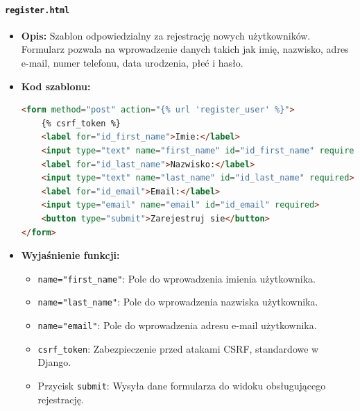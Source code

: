 \documentclass[12pt,a4paper,oneside]{article}
\theoremstyle{definition}
\numberwithin{equation}{section}
\begin{document}
\paragraph{\texttt{register.html}}
\begin{itemize}
    \item \textbf{Opis:} Szablon odpowiedzialny za rejestrację nowych użytkowników. Formularz pozwala na wprowadzenie danych takich jak imię, nazwisko, adres e-mail, numer telefonu, data urodzenia, płeć i hasło.
    \item \textbf{Kod szablonu:}
    \begin{lstlisting}[language=HTML, caption=Szablon \texttt{register.html}]
<form method="post" action="{% url 'register_user' %}">
    {% csrf_token %}
    <label for="id_first_name">Imie:</label>
    <input type="text" name="first_name" id="id_first_name" required>
    <label for="id_last_name">Nazwisko:</label>
    <input type="text" name="last_name" id="id_last_name" required>
    <label for="id_email">Email:</label>
    <input type="email" name="email" id="id_email" required>
    <button type="submit">Zarejestruj sie</button>
</form>
    \end{lstlisting}
    \item \textbf{Wyjaśnienie funkcji:}
    \begin{itemize}
        \item \texttt{name="first\_name"}: Pole do wprowadzenia imienia użytkownika.
        \item \texttt{name="last\_name"}: Pole do wprowadzenia nazwiska użytkownika.
        \item \texttt{name="email"}: Pole do wprowadzenia adresu e-mail użytkownika.
        \item \texttt{csrf\_token}: Zabezpieczenie przed atakami CSRF, standardowe w Django.
        \item Przycisk \texttt{submit}: Wysyła dane formularza do widoku obsługującego rejestrację.
    \end{itemize}
\end{itemize}
\end{document}
